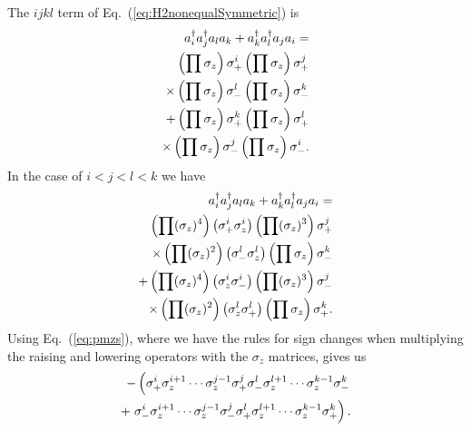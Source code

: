 The $ijkl$ term of Eq.~(\ref{eq:H2nonequalSymmetric}) is 
\begin{eqnarray}
a^\dag_i a^\dag_j a_l a_k + a_k^\dag
a_l^\dag a_j a_i= 
\notag\\
\left(\prod \sigma_z \right) \sigma_+^i \left(\prod \sigma_z \right)
\sigma_+^j \notag \\
\times\left(\prod \sigma_z \right) \sigma_-^l
\left(\prod \sigma_z \right) \sigma_-^k \notag \\
+\left(\prod \sigma_z \right) \sigma_+^k \left(\prod \sigma_z \right)
\sigma_+^l \notag \\
\times
\left(\prod \sigma_z \right) \sigma_-^j
\left(\prod \sigma_z \right) \sigma_-^i .
\end{eqnarray}
In the case of $i<j<l<k$ we have
\begin{eqnarray}
\label{eq:VijklPhi}
a^\dag_i a^\dag_j a_l a_k+ a_k^\dag a_l^\dag a_j a_i=\notag\\
\left(\prod (\sigma_z)^4\right) \left(\sigma_+^i \sigma_z^i\right)
\left(\prod (\sigma_z)^3\right) \sigma_+^j \notag \\
\times
\left(\prod (\sigma_z)^2\right) \left(\sigma_-^l \sigma_z^l \right)
\left(\prod \sigma_z\right) \sigma_-^k \notag \\
+\left(\prod (\sigma_z)^4\right) \left(\sigma_z^i\sigma_-^i\right)
\left(\prod (\sigma_z)^3\right) \sigma_-^j \notag \\
\times
\left(\prod (\sigma_z)^2\right) \left(\sigma_z^l\sigma_+^l \right)
\left(\prod \sigma_z\right) \sigma_+^k .
\end{eqnarray}
Using Eq.~(\ref{eq:pmzs}), where  we have the rules for sign changes when
multiplying the raising and lowering operators with the $\sigma_z$
matrices, gives us
\begin{eqnarray}
-\left(\sigma_+^i \sigma_z^{i+1}\cdots \sigma_z^{j-1} \sigma_+^j
\sigma_-^l \sigma_z^{l+1}\cdots \sigma_z^{k-1}\sigma_-^k\right. 
\notag\\
+ \left.\sigma_-^i \sigma_z^{i+1}\cdots \sigma_z^{j-1} \sigma_-^j
\sigma_+^l \sigma_z^{l+1}\cdots \sigma_z^{k-1}\sigma_+^k\right).
\end{eqnarray}


